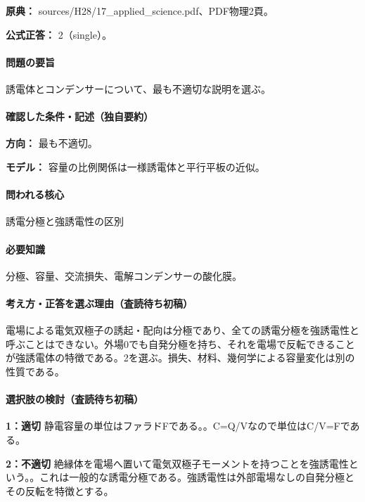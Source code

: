 \noindent\textbf{原典：} sources/H28/17\_applied\_science.pdf、PDF物理2頁。

\textbf{公式正答：} 2（single）。

\paragraph{問題の要旨} 誘電体とコンデンサーについて、最も不適切な説明を選ぶ。

\paragraph{確認した条件・記述（独自要約）}\mbox{}\par

\noindent\textbf{方向：} 最も不適切。\par

\noindent\textbf{モデル：} 容量の比例関係は一様誘電体と平行平板の近似。\par

\paragraph{問われる核心} 誘電分極と強誘電性の区別

\paragraph{必要知識} 分極、容量、交流損失、電解コンデンサーの酸化膜。

\paragraph{考え方・正答を選ぶ理由（査読待ち初稿）} 電場による電気双極子の誘起・配向は分極であり、全ての誘電分極を強誘電性と呼ぶことはできない。外場0でも自発分極を持ち、それを電場で反転できることが強誘電体の特徴である。2を選ぶ。損失、材料、幾何学による容量変化は別の性質である。

\paragraph{選択肢の検討（査読待ち初稿）}\mbox{}\par

\noindent\textbf{1：適切} 静電容量の単位はファラドFである。。C=\allowbreak{}Q/Vなので単位はC/V=\allowbreak{}Fである。\par

\noindent\textbf{2：不適切} 絶縁体を電場へ置いて電気双極子モーメントを持つことを強誘電性という。。これは一般的な誘電分極である。強誘電性は外部電場なしの自発分極とその反転を特徴とする。\par

